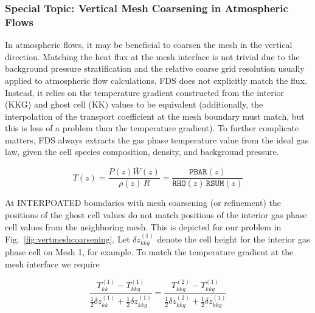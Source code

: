\subsubsection{Special Topic: Vertical Mesh Coarsening in Atmospheric Flows}

In atmospheric flows, it may be beneficial to coarsen the mesh in the vertical direction.  Matching the heat flux at the mesh interface is not trivial due to the background pressure stratification and the relative coarse grid resolution usually applied to atmospheric flow calculations.  FDS does not explicitly match the flux.  Instead, it relies on the temperature gradient constructed from the interior ({\ct KKG}) and ghost cell ({\ct KK}) values to be equivalent (additionally, the interpolation of the transport coefficient at the mesh boundary must match, but this is less of a problem than the temperature gradient).  To further complicate matters, FDS always extracts the gas phase temperature value from the ideal gas law, given the cell species composition, density, and background pressure.

\begin{equation}
\label{eq:EOScode}
T(z) = \frac{P(z) \overline{W}(z)}{\rho(z) \, R} = \frac{\mathtt{PBAR}(z)}{\mathtt{RHO}(z) \, \mathtt{RSUM}(z)}
\end{equation}

At {\ct INTERPOATED} boundaries with mesh coarsening (or refinement) the positions of the ghost cell values do not match positions of the interior gas phase cell values from the neighboring mesh.  This is depicted for our problem in Fig.~\ref{fig:vertmeshcoarsening}.  Let $\delta z^{(1)}_{kkg}$ denote the cell height for the interior gas phase cell on Mesh 1, for example.  To match the temperature gradient at the mesh interface we require

\begin{equation}
\label{eq:TMPatminterp}
\frac{T^{(1)}_{kk} - T^{(1)}_{kkg}}{\mbox{$\frac{1}{2}$} \delta z^{(1)}_{kk} + \mbox{$\frac{1}{2}$}\delta z^{(1)}_{kkg}} = \frac{T^{(2)}_{kkg} - T^{(1)}_{kkg}}{\mbox{$\frac{1}{2}$} \delta z^{(2)}_{kkg} + \mbox{$\frac{1}{2}$}\delta z^{(1)}_{kkg}}
\end{equation}

